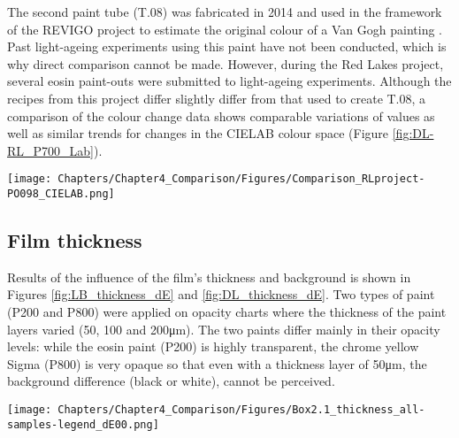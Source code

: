The second paint tube (T.08) was fabricated in 2014 and used in the framework of the \gls{REVIGO} project to estimate the original colour of a Van Gogh painting \citep{geldof_reconstructing_2018,kirchner_digitally_2017}. Past light-ageing experiments using this paint have not been conducted, which is why direct comparison cannot be made. However, during the Red Lakes project, several eosin paint-outs were submitted to light-ageing experiments. Although the recipes from this project differ slightly differ from that used to create T.08, a comparison of the colour change data shows comparable variations of \dEOO values as well as similar trends for changes in the CIELAB colour space (Figure \ref{fig:DL-RL_P700_Lab}).


\begin{figure*}[!h]
\centering
\texttt{[image: Chapters/Chapter4\_Comparison/Figures/Comparison\_RLproject-PO098\_CIELAB.png]}
\caption[\hspace{0.3cm}Comparison of the light-ageing experiments on eosin samples]{Comparison of the light-ageing experiments on eosin samples (results taken from the Red Lakes project with the permission of Klaas Jan van den Berg and from the daylight experiments).}
\label{fig:DL-RL_P700_Lab}
\end{figure*}


\subsection{Film thickness}

Results of the influence of the film’s thickness and background is shown in Figures \ref{fig:LB_thickness_dE} and \ref{fig:DL_thickness_dE}. Two types of paint (P200 and P800) were applied on opacity charts where the thickness of the paint layers varied (50, 100 and 200\unit{\um}). The two paints differ mainly in their opacity levels: while the eosin paint (P200) is highly transparent, the chrome yellow Sigma (P800) is very opaque so that even with a thickness layer of 50\unit{\um}, the background difference (\ie black or white), cannot be perceived. 


\begin{figure*}[!h]
\centering
\texttt{[image: Chapters/Chapter4\_Comparison/Figures/Box2.1\_thickness\_all-samples-legend\_dE00.png]}
\caption[\hspace{0.3cm}Light box samples - Film thickness]{Influence of the film thickness on the \dEOO curves for two paints in the light box experiments: (a) paint P200 ; (b) paint P800.}
\label{fig:LB_thickness_dE}
\end{figure*}


